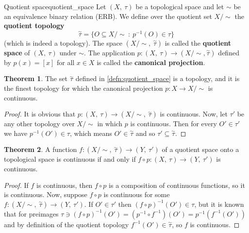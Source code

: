 \documentclass[a4paper]{book}
\theoremstyle{definition}
\newtheorem{theorem}{Theorem}[section]
\theoremstyle{ejemplo}
\theoremstyle{demostracion}
\newcommand{\quottop}{\stackrel{\sim}{\tau}}
\begin{document}
\begin{define}{Quotient space}{quotient_space}
	Let $(X,\ \tau)$ be a topological space and let $\sim$ be an equivalence binary relation (ERB). We define over the quotient set $X / \sim$ the \textbf{quotient topology}
	\begin{equation*}
		\stackrel{\sim}{\tau} = \{ O \subseteq X / \sim \ :\ p^{-1}(O) \in \tau\}
	\end{equation*}
	(which is indeed a topology). The space $(X / \sim,\ \stackrel{\sim}{\tau})$ is called the \textbf{quotient space} of $(X,\ \tau)$ under $\sim$. The application $p: (X,\ \tau) \rightarrow (X/\sim, \quottop)$ defined by $p(x) = [x]$ for all $x \in X$ is called the \textbf{canonical projection}.
\end{define}

\begin{theorem}
	The set $\stackrel{\sim}{\tau}$ defined in \eqref{defn:quotient_space} is a topology, and it is the finest topology for which the canonical projection $p: X \rightarrow X / \sim$ is continuous.
\end{theorem}

\begin{proof}
	It is obvious that $p:(X,\ \tau) \rightarrow (X/\sim,\ \quottop)$ is continuous. Now, let $\tau'$ be any other topology over $X/\sim$ in which $p$ is continuous. Then for every $O' \in \tau'$ we have $p^{-1}(O') \in \tau$, which means $O' \in \quottop$ and so $\tau' \subseteq \quottop$.
\end{proof}

\begin{theorem}\label{thm_contquot}
	A function $f: (X / \sim,\ \quottop) \rightarrow (Y,\ \tau')$ of a quotient space onto a topological space is continuous if and only if $f \circ p : (X,\ \tau) \rightarrow (Y,\ \tau')$ is continuous.
\end{theorem}

\begin{proof}
	If $f$ is continuous, then $f \circ p$ is a composition of continuous functions, so it is continuous. Now, suppose $f \circ p$ is continuous for some $f: (X / \sim,\ \quottop) \rightarrow (Y,\ \tau')$. If $O' \in \tau'$ then $(f \circ p)^{-1}(O') \in \tau$, but it is known that for preimages $\tau \ni (f \circ p)^{-1}(O') = (p^{-1} \circ f^{-1})(O') = p^{-1}(f^{-1}(O'))$ and by definition of the quotient topology $f^{-1}(O') \in \quottop$, so $f$ is continuous.
\end{proof}
\end{document}
